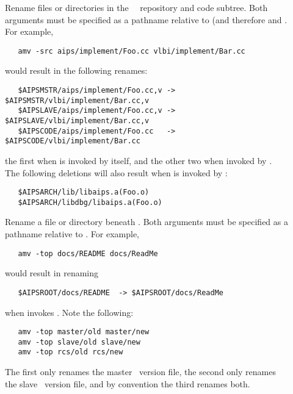 \begin{description}
\item[]
   Rename files or directories in the \aipspp\ \rcs\ repository and code
   subtree.  Both arguments must be specified as a pathname relative to
    (and therefore  and .
   For example,

\begin{verbatim}
   amv -src aips/implement/Foo.cc vlbi/implement/Bar.cc
\end{verbatim}

   \noindent
   would result in the following renames:

\begin{verbatim}
   $AIPSMSTR/aips/implement/Foo.cc,v -> $AIPSMSTR/vlbi/implement/Bar.cc,v
   $AIPSLAVE/aips/implement/Foo.cc,v -> $AIPSLAVE/vlbi/implement/Bar.cc,v
   $AIPSCODE/aips/implement/Foo.cc   -> $AIPSCODE/vlbi/implement/Bar.cc
\end{verbatim}

   \noindent
   the first when  is invoked by  itself, and
   the other two when invoked by .  The following deletions
   will also result when  is invoked by
   :

\begin{verbatim}
   $AIPSARCH/lib/libaips.a(Foo.o)
   $AIPSARCH/libdbg/libaips.a(Foo.o)
\end{verbatim}

\item[]
   Rename a file or directory beneath .  Both arguments must
   be specified as a pathname relative to .  For example,

\begin{verbatim}
   amv -top docs/README docs/ReadMe
\end{verbatim}

   \noindent
   would result in renaming

\begin{verbatim}
   $AIPSROOT/docs/README  -> $AIPSROOT/docs/ReadMe
\end{verbatim}

   \noindent
   when  invokes .  Note the following:

\begin{verbatim}
   amv -top master/old master/new
   amv -top slave/old slave/new
   amv -top rcs/old rcs/new
\end{verbatim}

   \noindent
   The first only renames the master \rcs\ version file, the second only
   renames the slave \rcs\ version file, and by convention the third
   renames both.
\end{description}

